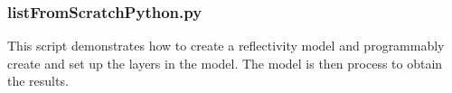 

\subsubsection{listFromScratchPython.py} 
This script demonstrates how to create a
reflectivity model and programmably create and set up the layers in the model.
The model is then process to obtain the results.


